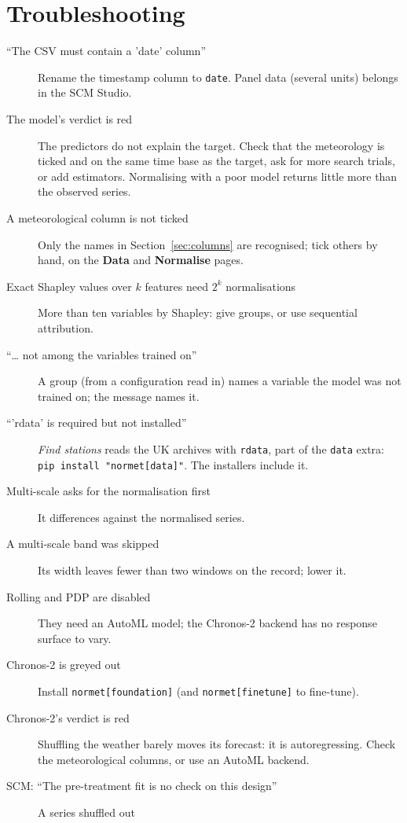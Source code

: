 \documentclass[11pt]{report}
\newcommand{\codeunderscore}{\textunderscore\allowbreak}
\newcommand{\code}[1]{\texttt{\let\_\codeunderscore #1}}
\newcommand{\tab}[1]{\textbf{#1}}
\begin{document}
\chapter{Troubleshooting}\label{app:trouble}
\begin{description}
  \item[``The CSV must contain a 'date' column''] Rename the timestamp column to
        \code{date}. Panel data (several units) belongs in the SCM Studio.
  \item[The model's verdict is red] The predictors do not explain the target. Check that
        the meteorology is ticked and on the same time base as the target, ask for more
        search trials, or add estimators. Normalising with a poor model returns little
        more than the observed series.
  \item[A meteorological column is not ticked] Only the names in
        Section~\ref{sec:columns} are recognised; tick others by hand, on the \tab{Data}
        and \tab{Normalise} pages.
  \item[Exact Shapley values over $k$ features need $2^k$ normalisations] More than ten
        variables by Shapley: give groups, or use sequential attribution.
  \item[``\ldots{} not among the variables trained on''] A group (from a configuration
        read in) names a variable the model was not trained on; the message names it.
  \item[``'rdata' is required but not installed''] \emph{Find stations} reads the UK
        archives with \code{rdata}, part of the \code{data} extra:
        \code{pip install "normet[data]"}. The installers include it.
  \item[Multi-scale asks for the normalisation first] It differences against the
        normalised series.
  \item[A multi-scale band was skipped] Its width leaves fewer than two windows on the
        record; lower it.
  \item[Rolling and PDP are disabled] They need an AutoML model; the Chronos-2 backend
        has no response surface to vary.
  \item[Chronos-2 is greyed out] Install \code{normet[foundation]} (and
        \code{normet[finetune]} to fine-tune).
  \item[Chronos-2's verdict is red] Shuffling the weather barely moves its forecast: it is
        autoregressing. Check the meteorological columns, or use an AutoML backend.
  \item[SCM: ``The pre-treatment fit is no check on this design''] A series shuffled out

\end{description}
\end{document}
